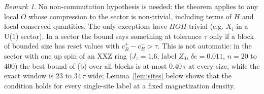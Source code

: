 \documentclass[aps,prx,onecolumn,10pt,nofootinbib,longbibliography,floatfix]{revtex4-2}
\theoremstyle{remark}
\newtheorem*{remark}{Remark}
\newcommand{\Jz}{J_z}
\newcommand{\de}{\delta e}
\begin{document}
\begin{remark}
No non-commutation hypothesis is needed: the theorem applies to any local $O$ whose compression to the sector is
non-trivial, including terms of $H$ and local conserved quantities. The only exceptions have $\Pi O\Pi$ trivial (e.g.
$X_i$ in a U(1) sector). In a sector the bound says something at tolerance $\tau$ only if a block of bounded size has %
reset values with $c_B^+-c_B^->\tau$. This is not automatic: in the sector with one up spin of an XXZ ring
($\Jz=1.6$, label $Z_0$, $\de=0.011$, $n=20$ to $400$) the best bound of (b) over all blocks is at most $0.40\,\tau$ %
at every size, while the exact window is $23$ to $34\,\tau$ wide; Lemma~\ref{lem:sites} below shows that the %
condition holds for every single-site label at a fixed magnetization density.


\end{remark}
\end{document}
